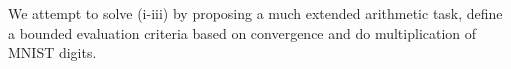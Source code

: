 We attempt to solve (i-iii) by proposing a much extended arithmetic task, define a bounded evaluation criteria based on convergence and do multiplication of MNIST digits.




